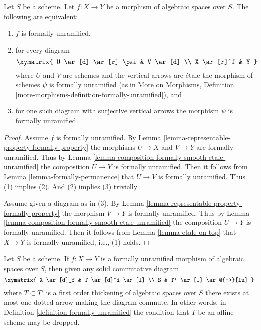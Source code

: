 \begin{lemma}
\label{lemma-formally-unramified}
Let $S$ be a scheme. Let $f : X \to Y$ be a morphism of algebraic spaces over
$S$. The following are equivalent:
\begin{enumerate}
\item $f$ is formally unramified,
\item for every diagram
$$
\xymatrix{
U \ar[d] \ar[r]_\psi & V \ar[d] \\
X \ar[r]^f & Y
}
$$
where $U$ and $V$ are schemes and the vertical arrows are \'etale
the morphism of schemes $\psi$ is formally unramified (as in
More on Morphisms,
Definition \ref{more-morphisms-definition-formally-unramified}), and
\item for one such diagram with surjective vertical arrows the morphism
$\psi$ is formally unramified.
\end{enumerate}
\end{lemma}

\begin{proof}
Assume $f$ is formally unramified. By
Lemma \ref{lemma-representable-property-formally-property}
the morphisms $U \to X$ and $V \to Y$ are formally unramified. Thus by
Lemma \ref{lemma-composition-formally-smooth-etale-unramified}
the composition $U \to Y$ is formally unramified. Then it follows from
Lemma \ref{lemma-formally-permanence}
that $U \to V$ is formally unramified. Thus (1) implies (2). And (2)
implies (3) trivially

\medskip\noindent
Assume given a diagram as in (3). By
Lemma \ref{lemma-representable-property-formally-property}
the morphism $V \to Y$ is formally unramified. Thus by
Lemma \ref{lemma-composition-formally-smooth-etale-unramified}
the composition $U \to Y$ is formally unramified. Then it follows from
Lemma \ref{lemma-etale-on-top}
that $X \to Y$ is formally unramified, i.e., (1) holds.
\end{proof}

\begin{lemma}
\label{lemma-formally-unramified-not-affine}
Let $S$ be a scheme.
If $f : X \to Y$ is a formally unramified morphism of algebraic spaces
over $S$, then given any solid commutative diagram
$$
\xymatrix{
X \ar[d]_f & T \ar[d]^i \ar[l] \\
S & T' \ar[l] \ar@{-->}[lu]
}
$$
where $T \subset T'$ is a first order thickening of algebraic spaces
over $S$ there exists at most one dotted arrow making the diagram commute.
In other words, in
Definition \ref{definition-formally-unramified}
the condition that $T$ be an affine scheme may be dropped.
\end{lemma}

